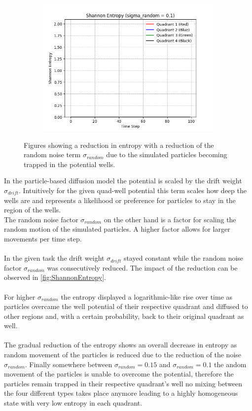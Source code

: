 \documentclass[]{scrartcl}
\begin{document}
\begin{figure}[h!]
\begin{subfigure}[c]{0.49\textwidth}
        \includegraphics[width=\linewidth]{Shannon_Entropy_(sigma_random_=_0.1).png}
    \end{subfigure}
    \caption{Figures showing a reduction in entropy with a reduction of the random noise term $\sigma_{random}$ due to the simulated particles becoming trapped in the potential wells.}
    \label{fig:ShannonEntropy}
\end{figure}

In the particle-based diffusion model the potential is scaled by the drift weight $\sigma_{drift}$. Intuitively for the given quad-well potential this term scales how deep the wells are and represents a likelihood or preference for particles to stay in the region of the wells.
\\
The random noise factor $\sigma_{random}$ on the other hand is a factor for scaling the random motion of the simulated particles. A higher factor allows for larger movements per time step.
\\ \\
In the given task the drift weight $\sigma_{drift}$ stayed constant while the random noise factor $\sigma_{random}$ was consecutively reduced.
The impact of the reduction can be observed in \autoref{fig:ShannonEntropy}.
\\ \\
For higher $\sigma_{random}$ the entropy displayed a logarithmic-like rise over time as particles overcame the well potential of their respective quadrant and diffused to other regions and, with a certain probability, back to their original quadrant as well.
\\ \\
The gradual reduction of the entropy shows an overall decrease in entropy as random movement of the particles is reduced due to the reduction of the noise $\sigma_{random}$. Finally somewhere between $\sigma_{random}=0.15$ and $\sigma_{random}=0.1$ the andom movement of the particles is unable to overcome the potential, therefore the particles remain trapped in their respective quadrant's well no mixing between the four different types takes place anymore leading to a highly homogeneous state with very low entropy in each quadrant.
\end{document}
